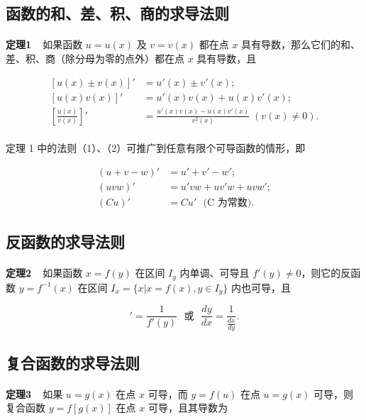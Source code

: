 \subsection{函数的和、差、积、商的求导法则}
\paragraph{}
\textbf{定理1~~}如果函数 $u = u(x)$ 及  $v = v(x)$ 都在点 $x$ 具有导数，那么它们的和、差、积、商（除分母为零的点外）都在点 $x$ 具有导数，且

\begin{align}
\left[u(x) \pm  v(x)\right]' &= u'(x) \pm v'(x); \\
\left[u(x)v(x)\right]' &= u'(x)v(x) + u(x)v'(x); \\
\left[\frac{u(x)}{v(x)}\right]' &= \frac{u'(x)v(x) - u(x)v'(x)}{v^2(x)} \; (v(x) \neq 0).
\end{align}

\paragraph{}
定理 1 中的法则（1）、（2）可推广到任意有限个可导函数的情形，即

\begin{align}
(u + v - w)' &= u' + v' - w'; \\
(uvw)' &= u'vw + uv'w + uvw'; \\
(Cu)' &= Cu' \text{~~(C 为常数)}.
\end{align}

\subsection{反函数的求导法则}
\paragraph{}
\textbf{定理2~~}如果函数 $x = f(y)$ 在区间 $I_y$ 内单调、可导且 $f'(y) \neq 0$，则它的反函数 $y = f^{-1}(x)$ 在区间 $I_x = \{x|x = f(x), y \in I_y\}$ 内也可导，且

\begin{equation}
[f^{-1}(x)]' = \frac{1}{f'(y)} \text{~~或~~} \frac{dy}{dx} = \frac{1}{\frac{dx}{dy}}.
\end{equation}

\subsection{复合函数的求导法则}
\paragraph{}
\textbf{定理3~~}如果 $u = g(x)$ 在点 $x$ 可导，而 $y = f(u)$ 在点 $u = g(x)$ 可导，则复合函数 $y = f[g(x)]$ 在点 $x$ 可导，且其导数为

